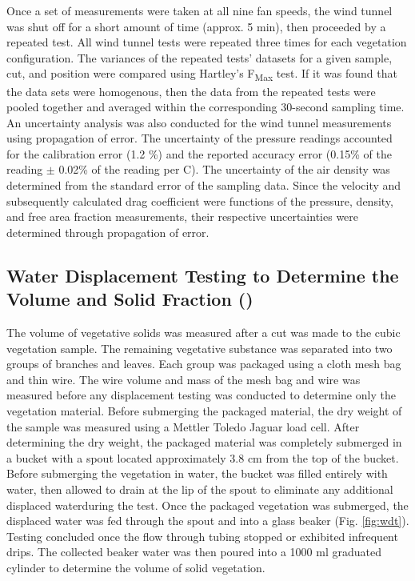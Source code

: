 \documentclass[12pt]{article}
\begin{document}
\indent Once a set of measurements were taken at all nine fan speeds, the wind tunnel was shut off for a short amount of time (approx. 5 min), then proceeded by a repeated test. All wind tunnel tests were repeated three times for each vegetation configuration. The variances of the repeated tests' datasets for a given sample, cut, and position were compared using Hartley's F\textsubscript{Max} test. If it was found that the data sets were homogenous, then the data from the repeated tests were pooled together and averaged within the corresponding 30-second sampling time. \\
\indent An uncertainty analysis was also conducted for the wind tunnel measurements using propagation of error. The uncertainty of the pressure readings accounted for the calibration error (1.2 \%) and the reported accuracy error (0.15\% of the reading $\pm$ 0.02\% of the reading per \textdegree C). The uncertainty of the air density was determined from the standard error of the sampling data. Since the velocity and subsequently calculated drag coefficient were functions of the pressure, density, and free area fraction measurements, their respective uncertainties were determined through propagation of error.


\subsection{Water Displacement Testing to Determine the Volume and Solid Fraction (\textbeta)}
\label{ssec:headingscap}

The volume of vegetative solids was measured after a cut was made to the cubic vegetation sample. The remaining vegetative substance was separated into two groups of branches and leaves. Each group was packaged using a cloth mesh bag and thin wire. The wire volume and mass of the mesh bag and wire was measured before any displacement testing was conducted to determine only the vegetation material. Before submerging the packaged material, the dry weight of the sample was measured using a Mettler Toledo Jaguar load cell. After determining the dry weight, the packaged material was completely submerged in a bucket with a spout located approximately 3.8 \si{cm} from the top of the bucket. Before submerging the vegetation in water, the bucket was filled entirely with water, then allowed to drain at the lip of the spout to eliminate any additional displaced waterduring the test. Once the packaged vegetation was submerged, the displaced water was fed through the spout and into a glass beaker (Fig. \ref{fig:wdt}). Testing concluded once the flow through tubing stopped or exhibited infrequent drips. The collected beaker water was then poured into a 1000 ml graduated cylinder to determine the volume of solid vegetation.\\
\end{document}
